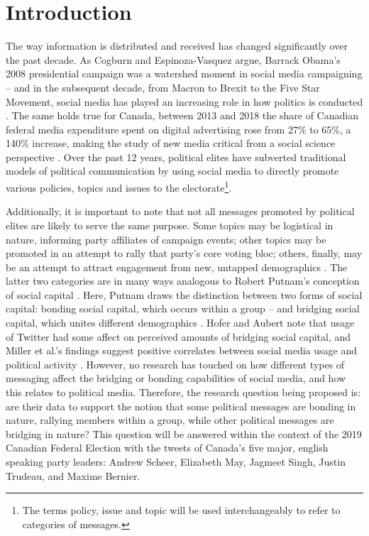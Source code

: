 \tableofcontents

\section{Introduction}

The way information is distributed and received has changed significantly over
the past decade. As Cogburn and Espinoza-Vasquez argue, Barrack Obama’s 2008
presidential campaign was a watershed moment in social media campaigning – and
in the subsequent decade, from Macron to Brexit to the Five Star Movement,
social media has played an increasing role in how politics is conducted
\cite{cogburn2011networked}.  The same holds true for Canada, between 2013 and
2018 the share of Canadian federal media expenditure spent on digital
advertising rose from 27\% to 65\%, a 140\% increase, making the study of new
media critical from a social science perspective
\cite{annualReportCanadaAdvertisingActivities_2018}. Over the past 12 years,
political elites have subverted traditional models of political communication by
using social media to directly promote various policies, topics and issues to
the electorate\footnote{The
terms policy, issue and topic will be used interchangeably to refer to
categories of messages.}\cite{mcnair2017introduction}.

Additionally, it is important to note that not all messages promoted by
political elites are likely to serve the same purpose. Some topics may be
logistical in nature, informing party affiliates of campaign events; other
topics may be promoted in an attempt to rally that party's core voting bloc;
others, finally, may be an attempt to attract engagement from new, untapped
demographics \cite{shah2007campaign}. The latter two categories are in many ways
analogous to Robert Putnam's conception of social capital
\cite{putnam2000bowling}. Here, Putnam draws the distinction between two forms
of social capital: bonding social capital, which occurs within a group -- and
bridging social capital, which unites different demographics
\cite{putnam2000bowling}. Hofer and Aubert note that usage of Twitter had some
affect on perceived amounts of bridging social capital, and Miller et al.'s
findings suggest positive correlates between social media usage and political
activity \cite{hofer2013perceived,miller2015talking}. However, no research has
touched on how different types of messaging affect the bridging or bonding
capabilities of social media, and how this relates to political media.
Therefore, the research question being proposed is: are their data to support
the notion that some political messages are bonding in nature, rallying members
within a group, while other political messages are bridging in nature? This
question will be answered within the context of the 2019 Canadian Federal
Election with the tweets of Canada’s five major, english speaking party leaders:
Andrew Scheer, Elizabeth May, Jagmeet Singh, Justin Trudeau, and Maxime Bernier.


